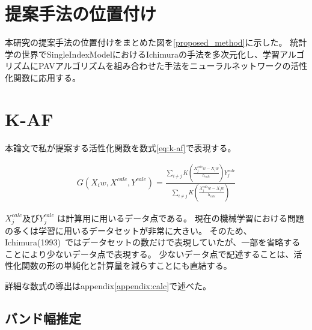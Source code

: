 \section{提案手法の位置付け}
\label {position_proposed}

本研究の提案手法の位置付けをまとめた図を\ref{proposed_method}に示した。
統計学の世界でSingleIndexModelにおけるIchimuraの手法を多次元化し、学習アルゴリズムにPAVアルゴリズムを組み合わせた手法をニューラルネットワークの活性化関数に応用する。



\section{K-AF}
\label {math}
本論文で私が提案する活性化関数を数式\ref{eq:k-af}で表現する。

\begin{eqnarray}
G(X_iw, X^{calc}, Y^{calc})=\frac{\sum_{i\neq j} K\left(\frac{X^{calc}_j w - X_i w}{h_{calc}}\right)Y^{calc}_j}{\sum_{i\neq j} K\left(\frac{X^{calc}_j w - X_i w}{h_{calc}}\right)}
\label{eq:k-af}
\end{eqnarray}


$ X^{calc}_j $及び$ Y^{calc}_j $ は計算用に用いるデータ点である。
現在の機械学習における問題の多くは学習に用いるデータセットが非常に大きい。
そのため、Ichimura(1993)~\cite{ichimura}ではデータセットの数だけで表現していたが、一部を省略することにより少ないデータ点で表現する。
少ないデータ点で記述することは、活性化関数の形の単純化と計算量を減らすことにも直結する。

詳細な数式の導出はappendix\ref{appendix:calc}で述べた。


\subsection{バンド幅推定}


